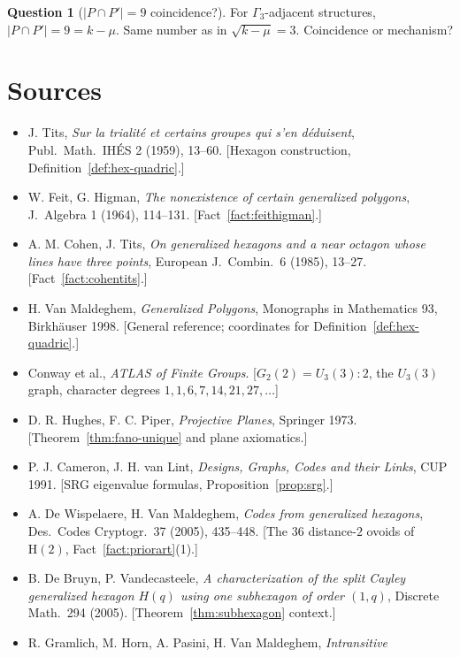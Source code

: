 \documentclass[11pt]{article}
\theoremstyle{definition}
\newtheorem{question}[theorem]{Question}
\begin{document}
\begin{question}[$|P \cap P'| = 9$ coincidence?]
For $\Gamma_3$-adjacent structures, $|P\cap P'| = 9 = k - \mu$. Same number
as in $\sqrt{k-\mu} = 3$. Coincidence or mechanism?
\end{question}

\section*{Sources}
\begin{itemize}
\item J. Tits, \emph{Sur la trialit\'e et certains groupes qui s'en
d\'eduisent}, Publ.\ Math.\ IH\'ES 2 (1959), 13--60. [Hexagon
construction, Definition~\ref{def:hex-quadric}.]
\item W. Feit, G. Higman, \emph{The nonexistence of certain generalized
polygons}, J.\ Algebra 1 (1964), 114--131. [Fact~\ref{fact:feithigman}.]
\item A. M. Cohen, J. Tits, \emph{On generalized hexagons and a near
octagon whose lines have three points}, European J.\ Combin.\ 6 (1985),
13--27. [Fact~\ref{fact:cohentits}.]
\item H. Van Maldeghem, \emph{Generalized Polygons}, Monographs in
Mathematics 93, Birkh\"auser 1998. [General reference; coordinates for
Definition~\ref{def:hex-quadric}.]
\item Conway et al., \emph{ATLAS of Finite Groups}. [$G_2(2) = U_3(3){:}2$,
the $U_3(3)$ graph, character degrees $1,1,6,7,14,21,27,\dots$]
\item D. R. Hughes, F. C. Piper, \emph{Projective Planes}, Springer 1973.
[Theorem~\ref{thm:fano-unique} and plane axiomatics.]
\item P. J. Cameron, J. H. van Lint, \emph{Designs, Graphs, Codes and their
Links}, CUP 1991. [SRG eigenvalue formulas, Proposition~\ref{prop:srg}.]
\item A. De Wispelaere, H. Van Maldeghem, \emph{Codes from generalized
hexagons}, Des.\ Codes Cryptogr.\ 37 (2005), 435--448. [The $36$
distance-$2$ ovoids of $\mathrm H(2)$, Fact~\ref{fact:priorart}(1).]
\item B. De Bruyn, P. Vandecasteele, \emph{A characterization of the split
Cayley generalized hexagon $H(q)$ using one subhexagon of order $(1,q)$},
Discrete Math.\ 294 (2005). [Theorem~\ref{thm:subhexagon} context.]
\item R. Gramlich, M. Horn, A. Pasini, H. Van Maldeghem, \emph{Intransitive
}
\end{itemize}
\end{document}

